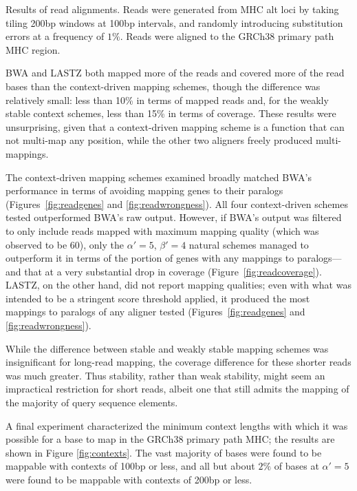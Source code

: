 \begin{FPfigure}
{  }
  \caption[Results of read alignments]{Results of read alignments. Reads were generated from MHC alt loci by taking tiling 200bp windows at 100bp intervals, and randomly introducing substitution errors at a frequency of $1\%$. Reads were aligned to the GRCh38 primary path MHC region.}
  \label{fig:read}
  
\end{FPfigure}

BWA and LASTZ both mapped more of the reads and covered more of the read bases than the context-driven mapping schemes, though the difference was relatively small: less than 10\% in terms of mapped reads and, for the weakly stable context schemes, less than 15\% in terms of coverage. These results were unsurprising, given that a context-driven mapping scheme is a function that can not multi-map any position, while the other two aligners freely produced multi-mappings.

The context-driven mapping schemes examined broadly matched BWA's performance in terms of avoiding mapping genes to their paralogs (Figures~\ref{fig:readgenes} and \ref{fig:readwrongness}). All four context-driven schemes tested outperformed BWA's raw output. However, if BWA's output was filtered to only include reads mapped with maximum mapping quality (which was observed to be 60), only the $\alpha'=5$, $\beta'=4$ natural schemes managed to outperform it in terms of the portion of genes with any mappings to paralogs---and that at a very substantial drop in coverage (Figure~\ref{fig:readcoverage}). LASTZ, on the other hand, did not report mapping qualities; even with what was intended to be a stringent score threshold applied, it produced the most mappings to paralogs of any aligner tested (Figures~\ref{fig:readgenes} and \ref{fig:readwrongness}). 

While the difference between stable and weakly stable mapping schemes was insignificant for long-read mapping, the coverage difference for these shorter reads was much greater. Thus stability, rather than weak stability, might seem an impractical restriction for short reads, albeit one that still admits the mapping of the majority of query sequence elements.

A final experiment characterized the minimum context lengths with which it was possible for a base to map in the GRCh38 primary path MHC; the results are shown in Figure \ref{fig:contexts}. The vast majority of bases were found to be mappable with contexts of 100bp or less, and all but about $2\%$ of bases at $\alpha' = 5$ were found to be mappable with contexts of 200bp or less.


